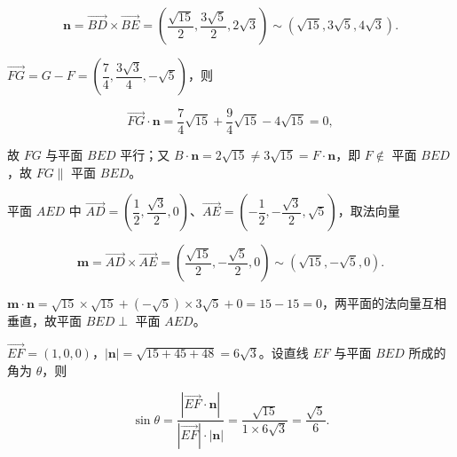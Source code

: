 \begin{answer}
\nopagebreak[4]
\[
\boldsymbol n=\overrightarrow{BD}\times\overrightarrow{BE}=\left(\dfrac{\sqrt{15}}{2},\dfrac{3\sqrt{5}}{2},2\sqrt{3}\right)\sim\left(\sqrt{15},3\sqrt{5},4\sqrt{3}\right).
\]

\(\overrightarrow{FG}=G-F=\left(\dfrac{7}{4},\dfrac{3\sqrt{3}}{4},-\sqrt{5}\right)\)，则

\nopagebreak[4]
\[
\overrightarrow{FG}\cdot\boldsymbol n=\dfrac{7}{4}\sqrt{15}+\dfrac{9}{4}\sqrt{15}-4\sqrt{15}=0,
\]

故 \(FG\) 与平面 \(BED\) 平行；又 \(B\cdot\boldsymbol n=2\sqrt{15}\neq 3\sqrt{15}=F\cdot\boldsymbol n\)，即 \(F\notin\) 平面 \(BED\)，故 \(FG\parallel\) 平面 \(BED\)。


平面 \(AED\) 中 \(\overrightarrow{AD}=\left(\dfrac{1}{2},\dfrac{\sqrt{3}}{2},0\right)\)、\(\overrightarrow{AE}=\left(-\dfrac{1}{2},-\dfrac{\sqrt{3}}{2},\sqrt{5}\right)\)，取法向量

\nopagebreak[4]
\[
\boldsymbol m=\overrightarrow{AD}\times\overrightarrow{AE}=\left(\dfrac{\sqrt{15}}{2},-\dfrac{\sqrt{5}}{2},0\right)\sim\left(\sqrt{15},-\sqrt{5},0\right).
\]

\(\boldsymbol m\cdot\boldsymbol n=\sqrt{15}\times\sqrt{15}+(-\sqrt{5})\times 3\sqrt{5}+0=15-15=0\)，两平面的法向量互相垂直，故平面 \(BED\perp\) 平面 \(AED\)。


\(\overrightarrow{EF}=(1,0,0)\)，\(|\boldsymbol n|=\sqrt{15+45+48}=6\sqrt{3}\)。设直线 \(EF\) 与平面 \(BED\) 所成的角为 \(\theta\)，则

\nopagebreak[4]
\[
\sin\theta=\dfrac{|\overrightarrow{EF}\cdot\boldsymbol n|}{|\overrightarrow{EF}|\cdot|\boldsymbol n|}=\dfrac{\sqrt{15}}{1\times 6\sqrt{3}}=\dfrac{\sqrt{5}}{6}.
\]




\end{answer}
